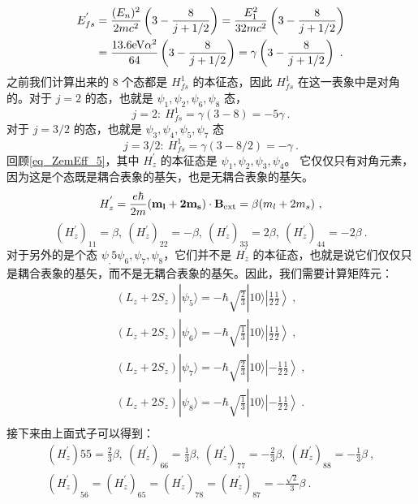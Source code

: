 \begin{align}
E_{fs}^{'}&=\frac{(E_n)^2}{2mc^2}\left(3-\frac{8}{j+1/2}\right)=\frac{E_1^2}{32mc^2}\left(3-\frac{8}{j+1/2}\right)\\
&=\frac{13.6\rm{eV}\alpha^2}{64}\left(3-\frac{8}{j+1/2}\right)=\gamma\left(3-\frac{8}{j+1/2}\right)~.
\end{align}
之前我们计算出来的 $8$ 个态都是 $H_{fs}^1$ 的本征态，因此 $H_{fs}^1$ 在这一表象中是对角的。对于 $j=2$ 的态，也就是 $\psi_1,\psi_2,\psi_6,\psi_8$ 态，
\begin{equation}
j=2: \ H_{fs}^1=\gamma(3-8)=-5\gamma~.
\end{equation}
对于 $j=3/2$ 的态，也就是 $\psi_3,\psi_4,\psi_5,\psi_7$ 态
\begin{equation}
j=3/2: \ H_{fs}^1=\gamma(3-8/2)=-\gamma~.
\end{equation}
回顾\autoref{eq_ZemEff_5}，其中 $H_z^{'}$ 的本征态是 $\psi_1,\psi_2,\psi_3,\psi_4$。 它仅仅只有对角元素，因为这是个态既是耦合表象的基矢，也是无耦合表象的基矢。
\begin{equation}
H_z^{'} = \frac{e\hbar}{2m}(\mathbf{m_l+2m_s})\cdot \mathbf{B}_{\rm{ext}}=\beta(m_l+2m_s)~,
\end{equation}
\begin{equation}
(H_z^{'})_{11}=\beta,\ (H_z^{'})_{22}=-\beta,\ (H_z^{'})_{33}=2\beta,\ (H_z^{'})_{44}=-2\beta~.
\end{equation}
对于另外的是个态 $\psi_,5\psi_6,\psi_7,\psi_8$，它们并不是 $H_{z}^{'}$ 的本征态，也就是说它们仅仅只是耦合表象的基矢，而不是无耦合表象的基矢。因此，我们需要计算矩阵元：
\begin{align}
(L_z+2S_z)|\psi_5\rangle= -\hbar\sqrt{\frac{2}{3}}|10\rangle\left|\frac{1}{2}\frac{1}{2}\right\rangle~,\\
(L_z+2S_z)|\psi_6\rangle=-\hbar\sqrt{\frac{1}{3}}|10\rangle\left|\frac{1}{2}\frac{1}{2}\right\rangle ~,\\
(L_z+2S_z)|\psi_7\rangle=-\hbar\sqrt{\frac{2}{3}}|10\rangle\left|-\frac{1}{2}\frac{1}{2}\right\rangle ~,\\
(L_z+2S_z)|\psi_8\rangle= -\hbar\sqrt{\frac{1}{3}}|10\rangle\left|-\frac{1}{2}\frac{1}{2}\right\rangle~.\\
\end{align}
接下来由上面式子可以得到：
\begin{align}
(H_z^{'}){55}=\frac{2}{3}\beta,\ (H_z^{'})_{66}=\frac{1}{3}\beta,\ (H_z^{'})_{77}=-\frac{2}{3}\beta,\ (H_z^{'})_{88}=-\frac{1}{3}\beta~,\\
(H_z^{'})_{56}=(H_z^{'})_{65}=(H_z^{'})_{78}=(H_z^{'})_{87}=-\frac{\sqrt{2}}{3}\beta~.
\end{align}
